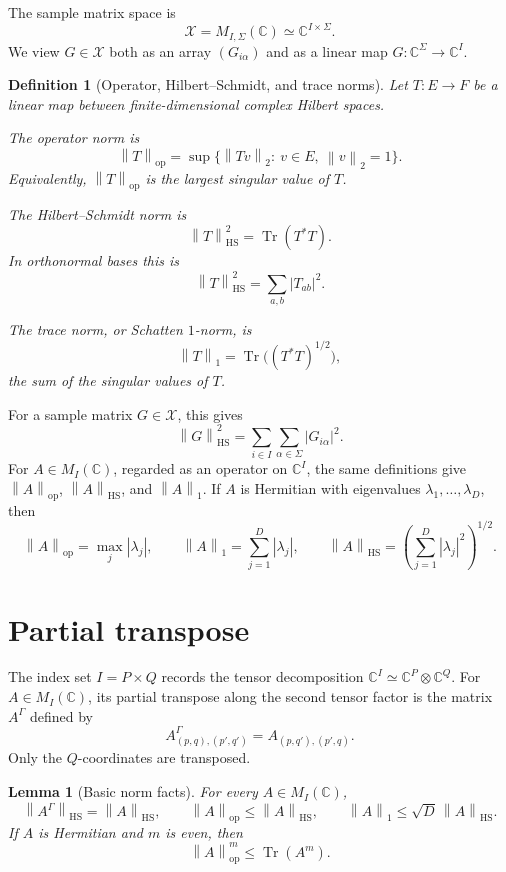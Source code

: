 \documentclass[11pt,oneside]{book}
\newtheorem{lemma}[theorem]{Lemma}
\newtheorem{definition}[theorem]{Definition}
\DeclareMathOperator{\Tr}{Tr}
\newcommand{\C}{\mathbb C}
\newcommand{\1}{\mathbf 1}
\newcommand{\GammaPT}{\Gamma}
\newcommand{\HS}{\mathrm{HS}}
\newcommand{\op}{\mathrm{op}}
\newcommand{\norm}[1]{\left\|#1\right\|}
\begin{document}
The sample matrix space is
\[
  \mathcal X=M_{I,\Sigma}(\C)\simeq \C^{I\times\Sigma}.
\]
We view \(G\in\mathcal X\) both as an array \((G_{i\alpha})\) and as a linear
map \(G:\C^\Sigma\to\C^I\).

\begin{definition}[Operator, Hilbert--Schmidt, and trace norms]
Let \(T:E\to F\) be a linear map between finite-dimensional complex Hilbert
spaces.

The operator norm is
\[
  \norm{T}_{\op}
  =
  \sup\{\norm{Tv}_2:\ v\in E,\ \norm v_2=1\}.
\]
Equivalently, \(\norm{T}_{\op}\) is the largest singular value of \(T\).

The Hilbert--Schmidt norm is
\[
  \norm{T}_{\HS}^2=\Tr(T^*T).
\]
In orthonormal bases this is
\[
  \norm{T}_{\HS}^2=\sum_{a,b}|T_{ab}|^2.
\]

The trace norm, or Schatten \(1\)-norm, is
\[
  \norm{T}_1=\Tr\bigl((T^*T)^{1/2}\bigr),
\]
the sum of the singular values of \(T\).
\end{definition}

For a sample matrix \(G\in\mathcal X\), this gives
\[
  \norm{G}_{\HS}^2
  =
  \sum_{i\in I}\sum_{\alpha\in\Sigma}|G_{i\alpha}|^2.
\]
For \(A\in M_I(\C)\), regarded as an operator on \(\C^I\), the same definitions
give \(\norm A_{\op}\), \(\norm A_{\HS}\), and \(\norm A_1\).  If \(A\) is
Hermitian with eigenvalues \(\lambda_1,\ldots,\lambda_D\), then
\[
  \norm A_{\op}=\max_j|\lambda_j|,
  \qquad
  \norm A_1=\sum_{j=1}^D|\lambda_j|,
  \qquad
  \norm A_{\HS}
  =
  \left(\sum_{j=1}^D|\lambda_j|^2\right)^{1/2}.
\]

\section{Partial transpose}

The index set \(I=P\times Q\) records the tensor decomposition
\(\C^I\simeq\C^P\otimes\C^Q\).  For \(A\in M_I(\C)\), its partial transpose
along the second tensor factor is the matrix \(A^{\GammaPT}\) defined by
\[
  A^{\GammaPT}_{(p,q),(p',q')}
  =
  A_{(p,q'),(p',q)}.
\]
Only the \(Q\)-coordinates are transposed.

\begin{lemma}[Basic norm facts]
For every \(A\in M_I(\C)\),
\[
  \norm{A^{\GammaPT}}_{\HS}=\norm A_{\HS},
  \qquad
  \norm A_{\op}\le \norm A_{\HS},
  \qquad
  \norm A_1\le \sqrt D\,\norm A_{\HS}.
\]
If \(A\) is Hermitian and \(m\) is even, then
\[
  \norm A_{\op}^m\le \Tr(A^m).
\]
\end{lemma}
\end{document}
